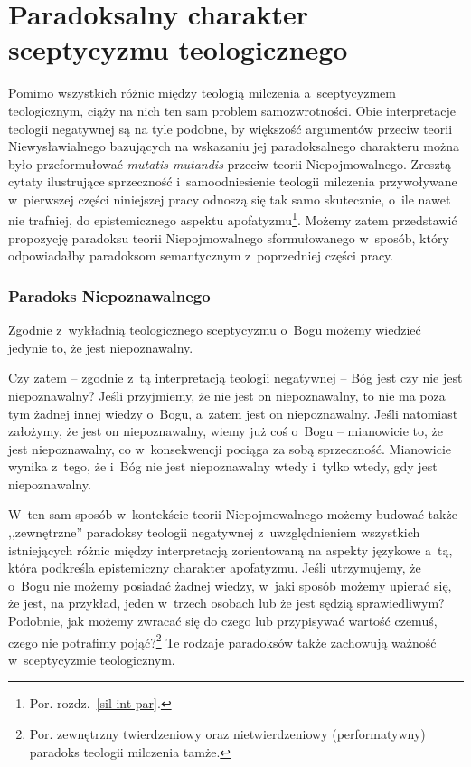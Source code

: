 \section{Paradoksalny charakter sceptycyzmu teologicznego}

Pomimo wszystkich różnic między teologią milczenia a~sceptycyzmem teologicznym, ciąży na nich ten sam problem samozwrotności. Obie interpretacje teologii negatywnej są na tyle podobne, by większość argumentów przeciw teorii Niewysławialnego bazujących na wskazaniu jej paradoksalnego charakteru można było przeformułować \textit{mutatis mutandis} przeciw teorii Niepojmowalnego. Zresztą cytaty ilustrujące sprzeczność i~samoodniesienie teologii milczenia przywoływane w~pierwszej części niniejszej pracy odnoszą się tak samo skutecznie, o~ile nawet nie trafniej, do epistemicznego aspektu apofatyzmu\footnote{Por. rozdz.~\ref{sil-int-par}.}. Możemy zatem przedstawić propozycję paradoksu teorii Niepojmowalnego sformułowanego w~sposób, który odpowiadałby paradoksom semantycznym z~poprzedniej części pracy.

\subsubsection{Paradoks Niepoznawalnego}

Zgodnie z~wykładnią teologicznego sceptycyzmu o~Bogu możemy wiedzieć jedynie to, że jest niepoznawalny.

Czy zatem -- zgodnie z~tą interpretacją teologii negatywnej -- Bóg jest czy nie jest niepoznawalny? Jeśli przyjmiemy, że nie jest on niepoznawalny, to nie ma poza tym żadnej innej wiedzy o~Bogu, a~zatem jest on niepoznawalny. Jeśli natomiast założymy, że jest on niepoznawalny, wiemy już coś o~Bogu -- mianowicie to, że jest niepoznawalny, co w~konsekwencji pociąga za sobą sprzeczność. Mianowicie wynika z~tego, że i~Bóg nie jest niepoznawalny wtedy i~tylko wtedy, gdy jest niepoznawalny.

W~ten sam sposób w~kontekście teorii Niepojmowalnego możemy budować także ,,zewnętrzne'' paradoksy teologii negatywnej z~uwzględnieniem wszystkich istniejących różnic między interpretacją zorientowaną na aspekty językowe a~tą, która podkreśla epistemiczny charakter apofatyzmu. Jeśli utrzymujemy, że o~Bogu nie możemy posiadać żadnej wiedzy, w~jaki sposób możemy upierać się, że jest, na przykład, jeden w~trzech osobach lub że jest sędzią sprawiedliwym? Podobnie, jak możemy zwracać się do czego lub przypisywać wartość czemuś, czego nie potrafimy pojąć?\footnote{Por. zewnętrzny twierdzeniowy oraz nietwierdzeniowy (performatywny) paradoks teologii milczenia tamże.} Te rodzaje paradoksów także zachowują ważność w~sceptycyzmie teologicznym.

